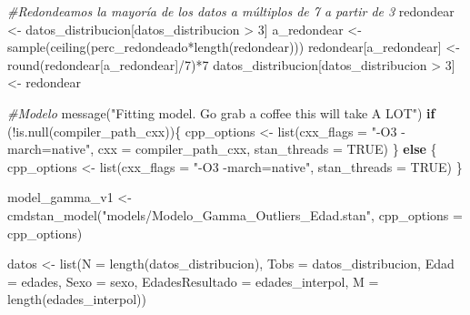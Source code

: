 \documentclass[
]{article}
\newenvironment{Shaded}{\begin{snugshade}}{\end{snugshade}}
\newcommand{\AttributeTok}[1]{\textcolor[rgb]{0.77,0.63,0.00}{#1}}
\newcommand{\CommentTok}[1]{\textcolor[rgb]{0.56,0.35,0.01}{\textit{#1}}}
\newcommand{\ConstantTok}[1]{\textcolor[rgb]{0.00,0.00,0.00}{#1}}
\newcommand{\ControlFlowTok}[1]{\textcolor[rgb]{0.13,0.29,0.53}{\textbf{#1}}}
\newcommand{\DecValTok}[1]{\textcolor[rgb]{0.00,0.00,0.81}{#1}}
\newcommand{\FunctionTok}[1]{\textcolor[rgb]{0.00,0.00,0.00}{#1}}
\newcommand{\NormalTok}[1]{#1}
\newcommand{\OtherTok}[1]{\textcolor[rgb]{0.56,0.35,0.01}{#1}}
\newcommand{\SpecialCharTok}[1]{\textcolor[rgb]{0.00,0.00,0.00}{#1}}
\newcommand{\StringTok}[1]{\textcolor[rgb]{0.31,0.60,0.02}{#1}}
\begin{document}
\begin{Shaded}
\begin{Highlighting}[]
\CommentTok{\#Redondeamos la mayoría de los datos a múltiplos de 7 a partir de 3}
\NormalTok{redondear   }\OtherTok{\textless{}{-}}\NormalTok{ datos\_distribucion[datos\_distribucion }\SpecialCharTok{\textgreater{}} \DecValTok{3}\NormalTok{]}
\NormalTok{a\_redondear }\OtherTok{\textless{}{-}} \FunctionTok{sample}\NormalTok{(}\FunctionTok{ceiling}\NormalTok{(perc\_redondeado}\SpecialCharTok{*}\FunctionTok{length}\NormalTok{(redondear)))}
\NormalTok{redondear[a\_redondear]                     }\OtherTok{\textless{}{-}} \FunctionTok{round}\NormalTok{(redondear[a\_redondear]}\SpecialCharTok{/}\DecValTok{7}\NormalTok{)}\SpecialCharTok{*}\DecValTok{7}
\NormalTok{datos\_distribucion[datos\_distribucion }\SpecialCharTok{\textgreater{}} \DecValTok{3}\NormalTok{] }\OtherTok{\textless{}{-}}\NormalTok{ redondear}

\CommentTok{\#Modelo}
\FunctionTok{message}\NormalTok{(}\StringTok{"Fitting model. Go grab a coffee this will take A LOT"}\NormalTok{)}
\ControlFlowTok{if}\NormalTok{ (}\SpecialCharTok{!}\FunctionTok{is.null}\NormalTok{(compiler\_path\_cxx))\{}
\NormalTok{  cpp\_options }\OtherTok{\textless{}{-}} \FunctionTok{list}\NormalTok{(}\AttributeTok{cxx\_flags =} \StringTok{"{-}O3 {-}march=native"}\NormalTok{, }
                      \AttributeTok{cxx =}\NormalTok{ compiler\_path\_cxx, }\AttributeTok{stan\_threads =} \ConstantTok{TRUE}\NormalTok{)}
\NormalTok{\} }\ControlFlowTok{else}\NormalTok{ \{}
\NormalTok{  cpp\_options }\OtherTok{\textless{}{-}} \FunctionTok{list}\NormalTok{(}\AttributeTok{cxx\_flags =} \StringTok{"{-}O3 {-}march=native"}\NormalTok{, }
                      \AttributeTok{stan\_threads =} \ConstantTok{TRUE}\NormalTok{)}
\NormalTok{\}}

\NormalTok{model\_gamma\_v1 }\OtherTok{\textless{}{-}} \FunctionTok{cmdstan\_model}\NormalTok{(}\StringTok{"models/Modelo\_Gamma\_Outliers\_Edad.stan"}\NormalTok{,}
                                \AttributeTok{cpp\_options =}\NormalTok{ cpp\_options)}

\NormalTok{datos }\OtherTok{\textless{}{-}} \FunctionTok{list}\NormalTok{(}\AttributeTok{N =} \FunctionTok{length}\NormalTok{(datos\_distribucion), }
              \AttributeTok{Tobs =}\NormalTok{ datos\_distribucion, }\AttributeTok{Edad =}\NormalTok{ edades, }\AttributeTok{Sexo =}\NormalTok{ sexo,}
              \AttributeTok{EdadesResultado =}\NormalTok{ edades\_interpol, }\AttributeTok{M =} \FunctionTok{length}\NormalTok{(edades\_interpol))}


\end{Highlighting}
\end{Shaded}
\end{document}
